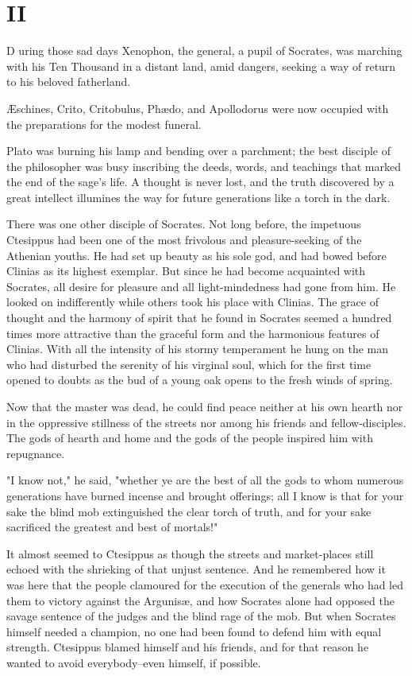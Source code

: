 \section{II}


\lettrine[lines=3,lhang=0.11,lraise=0,loversize=0.05]{D}{}%
uring those sad days Xenophon, the general, a pupil of Socrates, was
marching with his Ten Thousand in a distant land, amid dangers,
seeking a way of return to his beloved fatherland.

Æschines, Crito, Critobulus, Phædo, and Apollodorus were now occupied
with the preparations for the modest funeral.

Plato was burning his lamp and bending over a parchment; the best
disciple of the philosopher was busy inscribing the deeds, words, and
teachings that marked the end of the sage's life. A thought is never
lost, and the truth discovered by a great intellect illumines the way
for future generations like a torch in the dark.

There was one other disciple of Socrates. Not long before, the
impetuous Ctesippus had been one of the most frivolous and
pleasure-seeking of the Athenian youths. He had set up beauty as his
sole god, and had bowed before Clinias as its highest exemplar. But
since he had become acquainted with Socrates, all desire for pleasure
and all light-mindedness had gone from him. He looked on indifferently
while others took his place with Clinias. The grace of thought and the
harmony of spirit that he found in Socrates seemed a hundred times
more attractive than the graceful form and the harmonious features of
Clinias. With all the intensity of his stormy temperament he hung on
the man who had disturbed the serenity of his virginal soul, which for
the first time opened to doubts as the bud of a young oak opens to the
fresh winds of spring.

Now that the master was dead, he could find peace neither at his own
hearth nor in the oppressive stillness of the streets nor among his
friends and fellow-disciples. The gods of hearth and home and the gods
of the people inspired him with repugnance.

"I know not," he said, "whether ye are the best of all the gods to
whom numerous generations have burned incense and brought offerings;
all I know is that for your sake the blind mob extinguished the clear
torch of truth, and for your sake sacrificed the greatest and best of
mortals!"

It almost seemed to Ctesippus as though the streets and market-places
still echoed with the shrieking of that unjust sentence. And he
remembered how it was here that the people clamoured for the execution
of the generals who had led them to victory against the Argunisæ, and
how Socrates alone had opposed the savage sentence of the judges and
the blind rage of the mob. But when Socrates himself needed a
champion, no one had been found to defend him with equal strength.
Ctesippus blamed himself and his friends, and for that reason he
wanted to avoid everybody--even himself, if possible.

